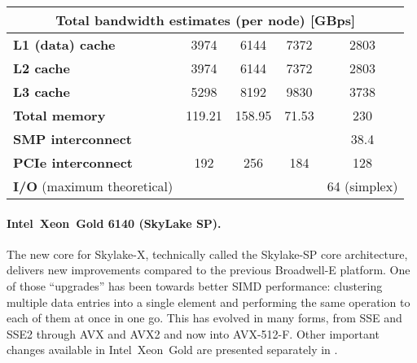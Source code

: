 \begin{table}
\begin{adjustbox}{width=1\textwidth}
\begin{tabular}{l|c|c|c|c|}
\multicolumn{5}{|c|}{Total bandwidth estimates (per node) [GBps]}  \\ \hline
\multicolumn{1}{|l|}{\textbf{L1 (data) cache}} & 3974 & 6144 & 7372 & 2803 \\ \hline
\multicolumn{1}{|l|}{\textbf{L2 cache}} & 3974 & 6144 & 7372 & 2803 \\ \hline
\multicolumn{1}{|l|}{\textbf{L3 cache}} & 5298 & 8192 & 9830 & 3738 \\ \hline
\multicolumn{1}{|l|}{\textbf{Total memory}} & 119.21 & 158.95 & 71.53 & 230 \\ \hline
\multicolumn{1}{|l|}{\textbf{SMP interconnect}} &  &  &  & 38.4 \\ \hline
\multicolumn{1}{|l|}{\textbf{PCIe interconnect}} & 192 & 256 & 184 & 128 \\ \hline
\multicolumn{1}{|l|}{\textbf{I/O} (maximum theoretical)} &  &  &  & 64 (simplex) \\ \hline
\end{tabular}
\end{adjustbox}
\end{table}

\paragraph{Intel\textregistered\ Xeon\textregistered\ Gold 6140 (SkyLake SP).}
The new core for Skylake-X, technically called the Skylake-SP core architecture, delivers new improvements compared to the previous Broadwell-E platform. One of those ``upgrades'' has been towards better SIMD performance: clustering multiple data entries into a single element and performing the same operation to each of them at once in one go. This has evolved in many forms, from SSE and SSE2 through AVX and AVX2 and now into AVX-512-F.
Other important changes available in Intel\textregistered\ Xeon\textregistered\ Gold are presented separately in \cite{INTELXEONGOLD6140}.

